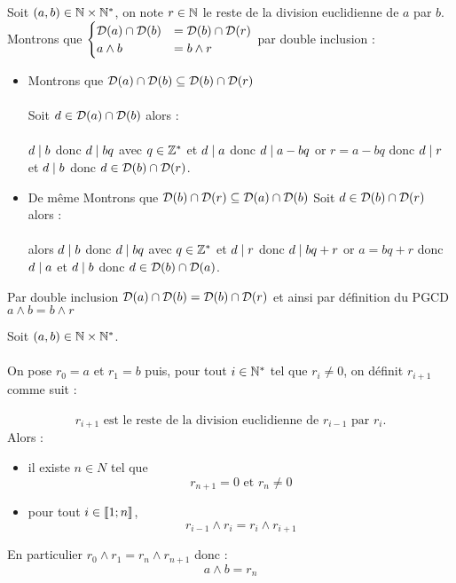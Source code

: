 \begin{dem}
	Soit \((a, b) \in \mathbb{N} \times \mathbb{N}^*\), on note \(r \in \mathbb{N}\) le reste de la division euclidienne de \(a\) par \(b\).
	Montrons que \(\begin{cases}
		\mathcal{D}(a) \cap \mathcal{D}(b) & = \mathcal{D}(b) \cap \mathcal{D}(r) \\
		a\wedge b                            & = b\wedge r
	\end{cases}\) par double inclusion :
	\begin{itemize}
		\item Montrons que \(\mathcal{D}(a) \cap \mathcal{D}(b) \subseteq \mathcal{D}(b) \cap \mathcal{D}(r)\)\\~\\
		      Soit \(d \in \mathcal{D}(a) \cap \mathcal{D}(b)\) alors : \\~\\
		      \(d \mid b\) donc \(d \mid bq\) avec \(q \in \mathbb{Z}^*\) et \(d \mid a\) donc \(d \mid a-bq\) or \(r = a-bq\) donc \(d \mid r\) et \(d \mid b\) donc \(d \in \mathcal{D}(b) \cap \mathcal{D}(r)\).
		\item De même Montrons que \(  \mathcal{D}(b) \cap \mathcal{D}(r) \subseteq \mathcal{D}(a) \cap \mathcal{D}(b)\)
		      Soit \(d \in \mathcal{D}(b) \cap \mathcal{D}(r)\) alors :\\~\\
		      alors \(d \mid b\) donc \(d \mid bq\) avec \(q \in \mathbb{Z}^*\) et \(d \mid r\) donc \(d \mid bq+r\) or \(a = bq+r\) donc \(d \mid a\) et \(d \mid b\) donc \(d \in \mathcal{D}(b) \cap \mathcal{D}(a)\).

	\end{itemize}
	\conclusion Par double inclusion \(\mathcal{D}(a) \cap \mathcal{D}(b) = \mathcal{D}(b) \cap \mathcal{D}(r)\) et ainsi par définition du PGCD \(a\wedge b = b\wedge r\)
\end{dem}

\begin{defprop}
	Soit \((a, b) \in \mathbb{N} \times \mathbb{N}^*\).\\~\\
	On pose \(r_0 = a\) et \(r_1 = b\) puis, pour tout \(i \in \mathbb{N}^*\) tel que \(r_i \neq 0\), on définit \(r_{i+1}\) comme suit :\\~\\
	\[r_{i+1}\text{ est le reste de la division euclidienne de } r_{i-1}\text{ par }r_i.\]
	Alors :
	\begin{itemize}
		\item il existe \(n \in N\) tel que
		      \[r_{n+1} = 0\text{ et }r_n \neq 0\]
		\item pour tout \(i \in \left\llbracket1;n\right\rrbracket \),
		      \[r_{i-1} \wedge r_i = r_i \wedge r_{i+1}\]
	\end{itemize}
	En particulier \(r_0 \wedge r_1 = r_n \wedge r_{n+1}\) donc :
	\[a \wedge b = r_n\]
\end{defprop}

